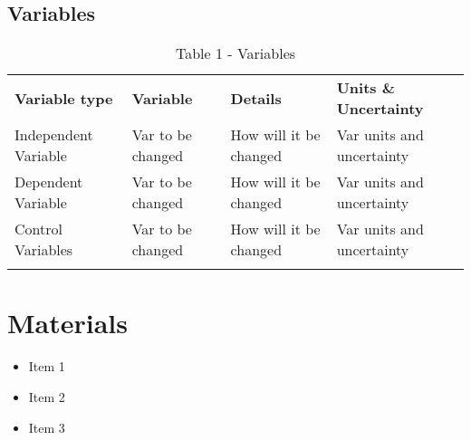 \documentclass{lab}
\begin{document}
	\noindent\begin{minipage}{\textwidth}
        \subsection*{Variables}
        \vspace{-0.2cm}
	\renewcommand{\arraystretch}{1.1}
        \begin{table}[H]
            \centering
            \begin{tabular}{l|l|l|l}
		    \dtoprule
		    \textbf{Variable type}	& \textbf{Variable}	& \textbf{Details}	& \textbf{Units \& Uncertainty}	\\
		    Independent Variable	& Var to be changed	& How will it be changed& Var units and uncertainty	\\
		    Dependent Variable		& Var to be changed	& How will it be changed& Var units and uncertainty	\\
		    Control Variables		& Var to be changed	& How will it be changed& Var units and uncertainty	\\
	    	    \dbottomrule
	    \end{tabular}
	    \caption{Table 1 - Variables}
	    \label{table: variables}
	\end{table}
	\end{minipage}

	\section*{Materials}
        \begin{itemize}
                \vspace{-0.3cm}
                \itemsep-3pt
                \item Item 1
		\item Item 2
		\item Item 3
        \end{itemize}
\end{document}
